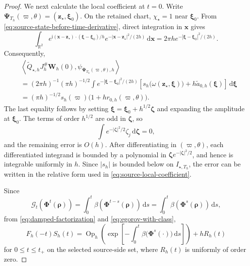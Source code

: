\documentclass[10pt,a4paper]{amsart}
\newcommand{\Op}{\operatorname{Op}}
\newcommand{\dd}{\,\mathrm{d}}
\newcommand{\ii}{\mathrm{i}}
\begin{document}
\begin{proof}
We next calculate the local coefficient at $t=0$. Write $\bm\Psi_{T_h}(\varpi,\theta)=(\bm z_\star,\bm\xi_0)$. On the retained chart, $\chi_\star=1$ near $\bm\xi_0$. From \eqref{eq:source-state-before-time-derivative}, direct integration in $\bm x$ gives
\begin{equation*}
 \int_{\mathbb R^2}e^{\ii(\bm x-\bm z_\star)\cdot(\bm\xi-\bm\xi_0)/h}e^{-|\bm x-\bm z_\star|^2/(2h)}\dd\bm x=2\pi h e^{-|\bm\xi-\bm\xi_0|^2/(2h)}.
\end{equation*}
Consequently,
\begin{equation}\label{eq:source-local-coefficient}
 \begin{aligned}
 &\left\langle \widetilde{Q}_{\star,h}J_h^{\#}\bm W_h(0),
 \psi_{\bm\Psi_{T_h}(\varpi,\theta),h}\right\rangle\\
 &=(2\pi h)^{-1}(\pi h)^{-1/2}
 \int e^{-|\bm\xi-\bm\xi_0|^2/(2h)}
 \left[s_h\bigl(\omega(\bm z_\star,\bm\xi)\bigr)
 +h\widetilde a_{0,h}(\bm\xi)\right]\dd\bm\xi\\
 &=(\pi h)^{-1/2}s_h(\varpi)
 \bigl(1+h r_{0,h}(\varpi,\theta)\bigr).
 \end{aligned}
\end{equation}
The last equality follows by setting $\bm\xi=\bm\xi_0+h^{1/2}\bm\zeta$ and expanding the amplitude at $\bm\xi_0$. The terms of order $h^{1/2}$ are odd in $\bm\zeta$, so
$$
    \int e^{-|\bm\zeta|^2/2}\zeta_j\dd\bm\zeta=0,    
$$  
and the remaining error is $O(h)$. After differentiating in $(\varpi,\theta)$, each differentiated integrand is bounded by a polynomial in $\bm\zeta e^{-|\bm\zeta|^2/2}$, and hence is integrable uniformly in $h$. Since $|s_h|$ is bounded below on $I_{\star,T_h}$, the error can be written in the relative form used in \eqref{eq:source-local-coefficient}.

Since 
\begin{equation*}
 \mathcal G_t(\bm\Phi^t(\bm\rho))=\int_0^t\beta(\bm\Phi^{t-s}(\bm\rho))\dd s=\int_0^t\beta(\bm\Phi^s(\bm\rho))\dd s,
\end{equation*}
from \eqref{eq:damped-factorization} and \eqref{eq:egorov-with-class},
\begin{equation}\label{eq:interaction-propagator}
 F_h(-t)S_h(t)=\Op_h\left(\exp\left[-\int_0^t\beta\bigl(\bm\Phi^s(\cdot)\bigr)\dd s\right]\right)+hR_h(t)
\end{equation}
for $0\le t\le t_+$ on the selected source-side set, where $R_h(t)$ is uniformly of order zero. 


\end{proof}
\end{document}
